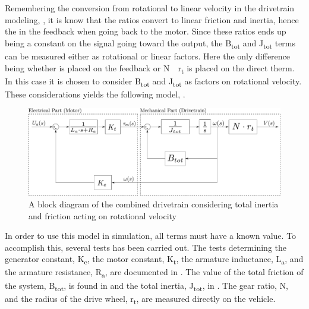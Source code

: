 Remembering the conversion from rotational to linear velocity in the drivetrain modeling, , it is know that the ratios convert to linear friction and inertia, hence the \si{} in the feedback when going back to the motor. Since these ratios ends up being a constant on the signal going toward the output, the \si{B_{tot}} and \si{J_{tot}} terms can be measured either as rotational or linear factors. Here the only difference being whether \si{} is placed on the feedback or \si{N\cdot r_t} is placed on the direct therm. In this case it is chosen to consider \si{B_{tot}} and \si{J_{tot}} as factors on rotational velocity. These considerations yields the following model, .
%
\begin{figure}[H]
	\centering
	\includegraphics[width=\textwidth]{figures/totalVelocityModelDiagramNotComplicated.pdf}
	\caption{A block diagram of the combined drivetrain considering total inertia and friction acting on rotational velocity}
	\label{fig:BlockDiagramDrivetrainNotComplicated}
\end{figure}
%
In order to use this model in simulation, all terms must have a known value. To accomplish this, several tests has been carried out. The tests determining the generator constant, \si{K_e}, the motor constant, \si{K_t}, the armature inductance, \si{L_a}, and the armature resistance, \si{R_a}, are documented in . The value of the total friction of the system, \si{B_{tot}}, is found in  and the total inertia, \si{J_{tot}}, in . The gear ratio, \si{N}, and the radius of the drive wheel, \si{r_t}, are measured directly on the vehicle.








